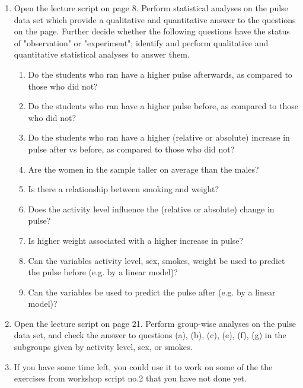 \begin{enumerate}
\item Open the lecture script on page 8. Perform statistical analyses on the pulse data set which provide a qualitative and quantitative answer to the questions on the page. Further decide whether the following questions have the status of "observation" or "experiment"; identify and perform qualitative and quantitative statistical analyses to answer them.
\begin{enumerate}
\item Do the students who ran have a higher pulse afterwards, as compared to those who did not?
\item Do the students who ran have a higher pulse before, as compared to those who did not?
\item Do the students who ran have a higher (relative or absolute) increase in pulse after vs before, as compared to those who did not?
\item Are the women in the sample taller on average than the males?
\item Is there a relationship between smoking and weight?
\item Does the activity level influence the (relative or absolute) change in pulse?
\item Is higher weight associated with a higher increase in pulse?
\item Can the variables activity level, sex, smokes, weight be used to predict the pulse before (e.g. by a linear model)?
\item Can the variables be used to predict the pulse after (e.g. by a linear model)?
\end{enumerate}

\item Open the lecture script on page 21. Perform group-wise analyses on the pulse data set, and check the answer to questions (a), (b), (c), (e), (f), (g) in the subgroups given by activity level, sex, or smokes.

\item If you have some time left, you could use it to work on some of the the exercises from workshop script no.2 that you have not done yet.


\end{enumerate}






